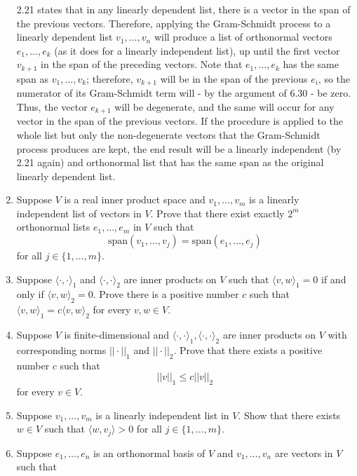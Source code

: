 \documentclass{book}
\begin{document}
\begin{enumerate}
2.21 states that in any linearly dependent list, there is a vector in the span of the previous vectors.  Therefore, applying the Gram-Schmidt process to a linearly dependent list \(v_1,\dots,v_n\) will produce a list of orthonormal vectors \(e_1,\dots,e_k\) (as it does for a linearly independent list), up until the first vector \(v_{k+1}\) in the span of the preceding vectors.  Note that \(e_1,\dots,e_k\) has the same span as \(v_1,\dots,v_k\); therefore, \(v_{k+1}\) will be in the span of the previous \(e_i\), so the numerator of its Gram-Schmidt term will - by the argument of 6.30 - be zero.  Thus, the vector \(e_{k+1}\) will be degenerate, and the same will occur for any vector in the span of the previous vectors.  If the procedure is applied to the whole list but only the non-degenerate vectors that the Gram-Schmidt process produces are kept, the end result will be a linearly independent (by 2.21 again) and orthonormal list that has the same span as the original linearly dependent list.

\item Suppose \(V\) is a real inner product space and \(v_1,\dots,v_m\) is a linearly independent list of vectors in \(V\).  Prove that there exist exactly \(2^m\) orthonormal lists \(e_1,\dots,e_m\) in \(V\) such that \[\textrm{span}(v_1,\dots,v_j)=\textrm{span}(e_1,\dots,e_j)\] for all \(j \in \{1,\dots,m\}\).

\item Suppose \(\langle \cdot,\cdot \rangle_1\) and \(\langle \cdot,\cdot \rangle_2\) are inner products on \(V\) such that \(\langle v,w \rangle_1=0\) if and only if \(\langle v,w \rangle_2=0\).  Prove there is a positive number \(c\) such that \(\langle v,w \rangle_1=c\langle v,w \rangle_2\) for every \(v,w \in V\).

\item Suppose \(V\) is finite-dimensional and \(\langle \cdot,\cdot \rangle_1,\langle \cdot,\cdot \rangle_2\) are inner products on \(V\) with corresponding norms \(||\cdot||_1\) and \(||\cdot||_2\).  Prove that there exists a positive number \(c\) such that \[||v||_1 \leq c||v||_2\] for every \(v \in V\).

\item Suppose \(v_1,\dots,v_m\) is a linearly independent list in \(V\).  Show that there exists \(w \in V\) such that \(\langle w,v_j \rangle > 0\) for all \(j \in \{1,\dots,m\}\).

\item Suppose \(e_1,\dots,e_n\) is an orthonormal basis of \(V\) and \(v_1,\dots,v_n\) are vectors in \(V\) such that


\end{enumerate}
\end{document}

